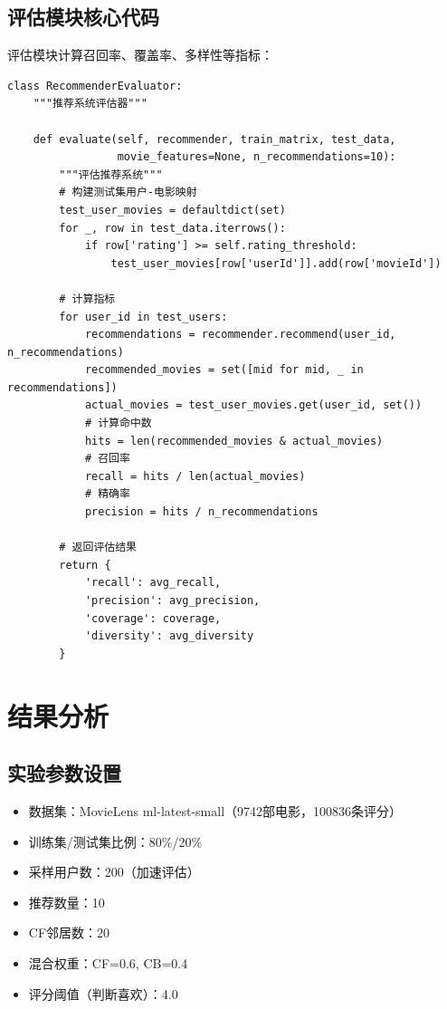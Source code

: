 \documentclass[a4paper]{article}
\begin{document}
\subsection{评估模块核心代码}

评估模块计算召回率、覆盖率、多样性等指标：

\begin{lstlisting}
class RecommenderEvaluator:
    """推荐系统评估器"""
    
    def evaluate(self, recommender, train_matrix, test_data, 
                 movie_features=None, n_recommendations=10):
        """评估推荐系统"""
        # 构建测试集用户-电影映射
        test_user_movies = defaultdict(set)
        for _, row in test_data.iterrows():
            if row['rating'] >= self.rating_threshold:
                test_user_movies[row['userId']].add(row['movieId'])
        
        # 计算指标
        for user_id in test_users:
            recommendations = recommender.recommend(user_id, n_recommendations)
            recommended_movies = set([mid for mid, _ in recommendations])
            actual_movies = test_user_movies.get(user_id, set())
            # 计算命中数
            hits = len(recommended_movies & actual_movies)
            # 召回率
            recall = hits / len(actual_movies)
            # 精确率
            precision = hits / n_recommendations
        
        # 返回评估结果
        return {
            'recall': avg_recall,
            'precision': avg_precision,
            'coverage': coverage,
            'diversity': avg_diversity
        }
\end{lstlisting}

\section{结果分析}

\subsection{实验参数设置}

\begin{itemize}
    \item 数据集：MovieLens ml-latest-small（9742部电影，100836条评分）
    \item 训练集/测试集比例：80\%/20\%
    \item 采样用户数：200（加速评估）
    \item 推荐数量：10
    \item CF邻居数：20
    \item 混合权重：CF=0.6, CB=0.4
    \item 评分阈值（判断喜欢）：4.0
\end{itemize}
\end{document}
